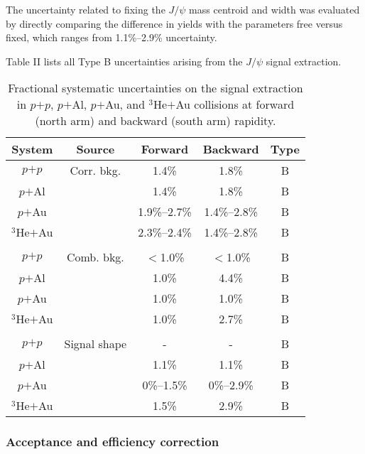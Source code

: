 \documentclass[twocolumn,letterpaper,aps,prc,longbibliography,superscriptaddress,nofootinbib,floatfix]{revtex4-1}
\newcommand{\pp}{\mbox{$p$$+$$p$}\xspace}
\newcommand{\pau}{\mbox{$p$$+$Au}\xspace}
\newcommand{\pal}{\mbox{$p$$+$Al}\xspace}
\newcommand{\heau}{\mbox{$^{3}$He$+$Au}\xspace}
\newcommand{\jpsi}{\mbox{$J/\psi$}\xspace}
\begin{document}
The uncertainty related to fixing the \jpsi mass centroid and width was 
evaluated by directly comparing the difference in yields with the 
parameters free versus fixed, which ranges from 1.1\%--2.9\% 
uncertainty.

Table II lists all Type B uncertainties arising from the \jpsi signal 
extraction.

\begin{table}[tbh]
\caption{\label{tab:sys_fit}
Fractional systematic uncertainties on the signal extraction in \pp, 
\pal, \pau, and \heau collisions at forward (north arm) and backward 
(south arm) rapidity.
}
\begin{ruledtabular}
\begin{tabular}{ccccc}
 System & Source        & Forward       & Backward     & Type\\
\hline
\pp   & Corr. bkg.      & 1.4\%         & 1.8\%        & B   \\ 
\pal  &                 & 1.4\%         & 1.8\%        & B   \\
\pau  &                 & 1.9\%--2.7\%  & 1.4\%--2.8\% & B   \\
\heau &                 & 2.3\%--2.4\%  & 1.4\%--2.8\% & B   \\
\\
\pp   & Comb. bkg.      & $<$1.0\%      & $<$1.0\%     & B   \\ 
\pal  &                 & 1.0\%         & 4.4\%        & B   \\
\pau  &                 & 1.0\%         & 1.0\%        & B   \\
\heau &                 & 1.0\%         & 2.7\%        & B   \\ 
\\
\pp   & Signal shape    & -             &  -           & B   \\ 
\pal  &                 & 1.1\%         & 1.1\%        & B   \\
\pau  &                 & 0\%--1.5\%    & 0\%--2.9\%   & B   \\
\heau &                 & 1.5\%         & 2.9\%        & B 
\end{tabular}
\end{ruledtabular}
\end{table}

\subsubsection{Acceptance and efficiency correction}
\end{document}
